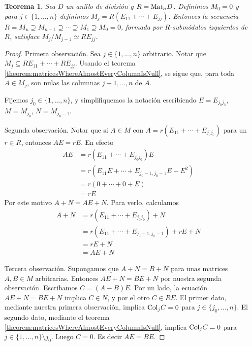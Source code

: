\documentclass{report}
\newcommand{\Mat}{\textnormal{Mat}}
\newcommand{\Col}{\textnormal{Col}}
\newtheorem{theorem}{Teorema}
\begin{document}
  \begin{theorem}
    \label{theorem:compositionSeriesOfLeftModulesForMatrixRing}
    Sea \(D\) un anillo de división y \(R = \Mat_n D\).
    Definimos \(M_0 = 0\) y para \(j \in \{1, \dots, n\}\) definimos \(M_j = R (E_{1 1} + \cdots + E_{j j})\).
    Entonces la secuencia \(R = M_n \supseteq M_{n - 1} \supseteq \cdots \supseteq M_1 \supseteq M_0 = 0\), formada por \(R\)-submódulos izquierdos de \(R\), satisface \(M_j / M_{j - 1} \simeq R E_{j j}\).
  \end{theorem}
  \begin{proof}
    Primera observación.
    Sea \(j \in \{1, \dots, n\}\) arbitrario.
    Notar que \(M_j \subseteq R E_{1 1} + \cdots + R E_{j j}\).
    Usando el teorema \ref{theorem:matricesWhereAlmostEveryColumnIsNull}, se sigue que, para toda \(A \in M_j\), son nulas las columnas \(j + 1, \dots, n\) de \(A\).

    Fijemos \(j_0 \in \{1, \dots, n\}\), y simplifiquemos la notación escribiendo \(E = E_{j_0 j_0}\), \(M = M_{j_0}\), \(N = M_{j_0 - 1}\).

    Segunda observación.
    Notar que si \(A \in M\) con \(A = r (E_{1 1} + \cdots + E_{j_0 j_0})\) para un \(r \in R\), entonces \(A E = r E\).
    En efecto
    \begin{align}
      A E
      &=
      r (E_{11} + \cdots + E_{j_0 j_0}) E
      \\
      &=
      r (E_{11} E + \cdots + E_{j_0 - 1, j_0 - 1} E + E^2)
      \\
      &=
      r (0 + \cdots + 0 + E)
      \\
      &=
      r E
    \end{align}
    Por este motivo \(A + N = A E + N\).
    Para verlo, calculamos
    \begin{align}
      A + N
      &=
      r (E_{1 1} + \cdots + E_{j_0 j_0}) + N
      \\
      &=
      r(E_{1 1} + \cdots + E_{j_0 - 1, j_0 - 1}) + r E + N
      \\
      &=
      r E + N
      \\
      &=
      A E + N
    \end{align}

    Tercera observación.
    Supongamos que \(A + N = B + N\) para unas matrices \(A, B \in M\) arbitrarias.
    Entonces \(A E + N = B E + N\) por nuestra segunda observación.
    Escribamos \(C = (A - B) E\).
    Por un lado, la ecuación \(A E + N = B E + N\) implica \(C \in N\), y por el otro \(C \in R E\).
    El primer dato, mediante nuestra primera observación, implica \(\Col_j C = 0\) para \(j \in \{j_0, \dots, n\}\).
    El segundo dato, mediante el teorema \ref{theorem:matricesWhereAlmostEveryColumnIsNull}, implica \(\Col_j C = 0\) para \(j \in \{1, \dots, n\} \setminus j_0\).
    Luego \(C = 0\).
    Es decir \(A E = B E\).


\end{proof}
\end{document}
